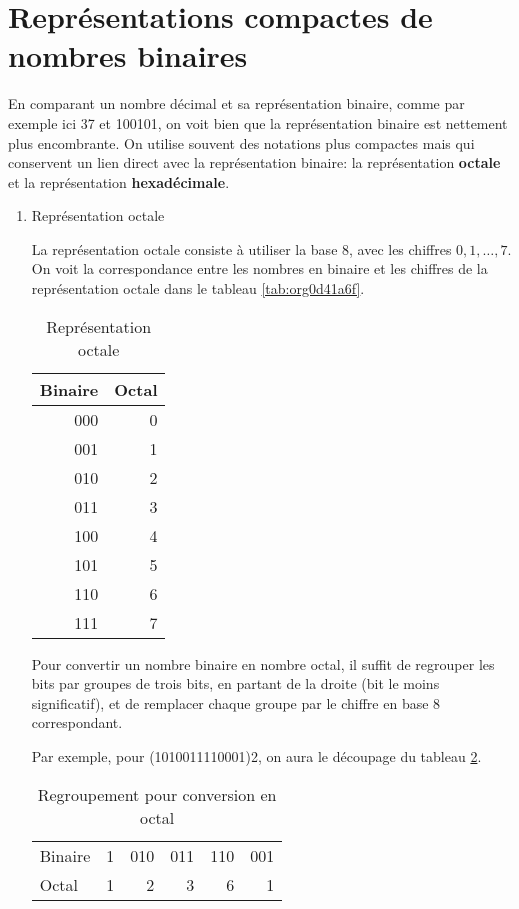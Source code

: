 \documentclass[letter, oneside]{book}
\begin{document}
\section{Représentations compactes de nombres binaires}
\label{sec:org9f9bd0a}

En comparant un nombre décimal et sa représentation binaire, comme par
exemple ici 37 et 100101, on voit bien que la représentation binaire
est nettement plus encombrante. On utilise souvent des notations plus
compactes mais qui conservent un lien direct avec la représentation
binaire: la représentation \textbf{octale} et la représentation
\textbf{hexadécimale}.

\begin{enumerate}
\item Représentation octale
\label{sec:orgd88b55e}

La représentation octale consiste à utiliser la base 8, avec les
chiffres \(0, 1, \ldots, 7\). On voit la correspondance entre les
nombres en binaire et les chiffres de la représentation octale dans le
tableau \ref{tab:org0d41a6f}.

\begin{table}[htbp]
\caption{\label{tab:org88ebfb6}Représentation octale}
\centering
\begin{tabular}{rr}
Binaire & Octal\\[0pt]
\hline
000 & 0\\[0pt]
001 & 1\\[0pt]
010 & 2\\[0pt]
011 & 3\\[0pt]
100 & 4\\[0pt]
101 & 5\\[0pt]
110 & 6\\[0pt]
111 & 7\\[0pt]
\end{tabular}
\end{table}

Pour convertir un nombre binaire en nombre octal, il suffit de
regrouper les bits par groupes de trois bits, en partant de la droite
(bit le moins significatif), et de remplacer chaque groupe par le
chiffre en base 8 correspondant.

Par exemple, pour (1010011110001)2, on aura le découpage du tableau
\ref{tab:org6c71a06}.

\begin{table}[htbp]
\caption{\label{tab:org6c71a06}Regroupement pour conversion en octal}
\centering
\begin{tabular}{lrrrrr}
 &  &  &  &  & \\[0pt]
\hline
Binaire & 1 & 010 & 011 & 110 & 001\\[0pt]
Octal & 1 & 2 & 3 & 6 & 1\\[0pt]
\end{tabular}
\end{table}


\end{enumerate}
\end{document}
